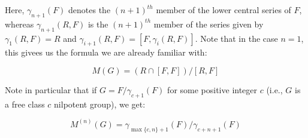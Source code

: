 Here, $\gamma_{n+1}(F)$ denotes the $(n+1)^{th}$ member of the lower
central series of $F$, whereas $\gamma_{n+1}(R,F)$ is the $(n+1)^{th}$
member of the series given by $\gamma_1(R,F) = R$ and
$\gamma_{i+1}(R,F) = [F,\gamma_i(R,F)]$. Note that in the case $n =
1$, this givees us the formula we are already familiar with:

$$M(G) = (R \cap [F,F])/[R,F]$$

Note in particular that if $G = F/\gamma_{c+1}(F)$ for some positive
integer $c$ (i.e., $G$ is a free class $c$ nilpotent group), we get:

$$M^{(n)}(G) = \gamma_{\max \{ c,n \} + 1}(F)/\gamma_{c+n+1}(F)$$

